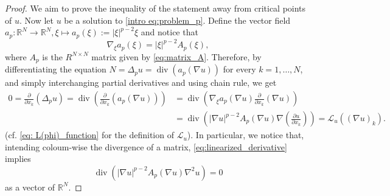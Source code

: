 \documentclass[10pt,a4paper, reqno]{amsart}
\numberwithin{equation}{section}
\newcommand{\R}{\mathbb{R}}
\renewcommand{\div}{\operatorname{div}}
\begin{document}
    \begin{proof}
    We aim to prove the inequality of the statement away from critical points of $u$. 
    Now let $u$ be a solution to \eqref{intro eq:problem_p}. Define the vector field $a_p \colon \R^N \to \R^N, \xi \mapsto a_p(\xi):= |\xi|^{p-2} \xi$ and notice that 
    \begin{equation*}
        \nabla_\xi a_p(\xi) = |\xi|^{p-2} A_p(\xi),
    \end{equation*}
    where $A_p$ is the $R^{N\times N}$ matrix given by \eqref{eq:matrix_A}.
    Therefore, by differentiating the equation $N = \Delta_p u = \div(a_p(\nabla u))$
    for every $k=1,\dots,N$, and simply interchanging partial derivatives and using chain rule, we get
    \begin{equation}\label{eq:linearized_derivative}
    \begin{split}
        0 = \frac{\partial}{\partial x_k}(\Delta_p u) = \div \left( \frac{\partial}{\partial x_k}(a_p(\nabla u)) \right) &= \div \left( \nabla_\xi a_p (\nabla u) \frac{\partial}{\partial x_k} (\nabla u)\right) 
        \\
        &= \div \left( |\nabla u|^{p-2} A_p(\nabla u) \nabla \left( \frac{\partial u}{\partial x_k} \right) \right)
        =\mathcal{L}_u((\nabla u)_{k}).
    \end{split}
    \end{equation}
    (cf. \eqref{eq: L(phi)_function} for the definition of $\mathcal{L}_u$). In particular, we notice that, intending coloum-wise the divergence of a matrix, 
    \eqref{eq:linearized_derivative} implies
    \begin{equation}\label{eq:linearized_derivative2}
    \div \left( |\nabla u|^{p-2} A_p(\nabla u) \nabla^2 u \right) = 0       
    \end{equation}
    as a vector of $\R^N$.
    

\end{proof}
\end{document}
